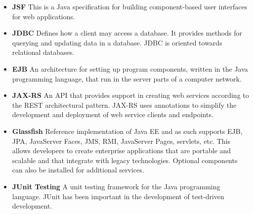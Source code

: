 \begin{itemize}
		\item \textbf{JSF} This is a Java specification for building component-based user interfaces for web applications.
			
			\item \textbf{JDBC} Defines how a client may access a database. It provides methods for querying and updating data in a database. JDBC is oriented towards relational databases.
			
			\item \textbf{EJB} An architecture for setting up program components, written in the Java programming language, that run in the server parts of a computer network.
			
			\item \textbf{JAX-RS} An API that provides support in creating web services according to the REST architectural pattern. JAX-RS uses annotations to simplify the development and deployment of web service clients and endpoints.
			
			\item \textbf{Glassfish}  Reference implementation of Java EE and as such supports EJB, JPA, JavaServer Faces, JMS, RMI, JavaServer Pages, servlets, etc. This allows developers to create enterprise applications that are portable and scalable and that integrate with legacy technologies. Optional components can also be installed for additional services.
			
			\item \textbf{JUnit Testing} A unit testing framework for the Java programming language. JUnit has been important in the development of test-driven development.
		
\end{itemize}